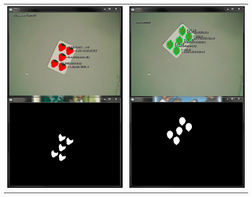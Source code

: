 \begin{center}
\begin{tabular}{cc}
\includegraphics[height=10cm]{Abbildungen/Erdbeere01} & \includegraphics[height=10cm]{Abbildungen/Limonen01} \\ 

\end{tabular}
\end{center}
